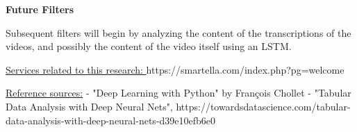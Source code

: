 \documentclass{article}
\newcommand{\br}{ \hfill \break}
\begin{document}
\begin{adjustwidth}{2.5em}{0pt}
\begin{adjustwidth}{2.5em}{0pt}
\end{adjustwidth} \br 


\textbf{Future Filters}\br \begin{adjustwidth}{2.5em}{0pt}
Subsequent filters will begin by analyzing the content of the transcriptions of the videos, and possibly the content of the video itself using an LSTM.
\end{adjustwidth} \br

\underline{Services related to this research: }\br 
https://smartella.com/index.php?pg=welcome \br 
\br 

\underline{Reference sources:}\br 
- "Deep Learning with Python" by François Chollet \br
- "Tabular Data Analysis with Deep Neural Nets", https://towardsdatascience.com/tabular-data-analysis-with-deep-neural-nets-d39e10efb6e0 \br

\end{adjustwidth} \br 
\end{document}
